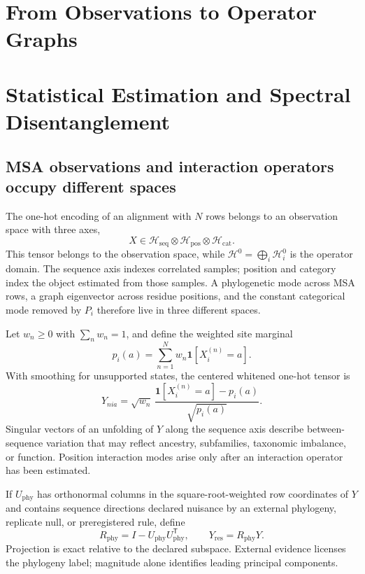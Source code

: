 \documentclass[10pt]{article}
\theoremstyle{definition}
\theoremstyle{remark}
\newcommand{\BookChapter}[1]{\section{#1}}
\newcommand{\BookInsert}[1]{}
\newcommand{\BookChapterLabel}[1]{}
\newcommand{\BookSection}[1]{\subsection{#1}}
\begin{document}
\ifdefined\BOOKMODE
\BookChapter{From Observations to Operator Graphs}
\BookChapterLabel{chap:book-observations}
\else
\BookChapter{Statistical Estimation and Spectral Disentanglement}
\fi
\BookInsert{chapters/08_opening}

\BookSection{MSA observations and interaction operators occupy different spaces}

The one-hot encoding of an alignment with $N$ rows belongs to an observation space with three axes,
\begin{equation}
X\in
\mathcal H_{\mathrm{seq}}
\otimes\mathcal H_{\mathrm{pos}}
\otimes\mathcal H_{\mathrm{cat}}.
\label{eq:msa-three-axes}
\end{equation}
This tensor belongs to the observation space, while
$\mathcal H^0=\bigoplus_i\mathcal H_i^0$ is the operator domain.  The sequence axis indexes
correlated samples; position and category index the object estimated from those samples.  A
phylogenetic mode across MSA rows, a graph eigenvector across residue positions, and the constant
categorical mode removed by $P_i$ therefore live in three different spaces.

Let $w_n\geq0$ with $\sum_nw_n=1$, and define the weighted site marginal
\begin{equation}
p_i(a)=\sum_{n=1}^Nw_n\mathbf1[X_i^{(n)}=a].
\label{eq:weighted-msa-marginal}
\end{equation}
With smoothing for unsupported states, the centered whitened one-hot tensor is
\begin{equation}
Y_{nia}
=\sqrt{w_n}\,
\frac{\mathbf1[X_i^{(n)}=a]-p_i(a)}{\sqrt{p_i(a)}}.
\label{eq:whitened-msa}
\end{equation}
Singular vectors of an unfolding of $Y$ along the sequence axis describe between-sequence
variation that may reflect ancestry, subfamilies, taxonomic imbalance, or function.  Position
interaction modes arise only after an interaction operator has been estimated.

If $U_{\mathrm{phy}}$ has orthonormal columns in the square-root-weighted row coordinates of $Y$
and contains sequence directions declared nuisance by an external phylogeny, replicate null, or
preregistered rule, define
\begin{equation}
R_{\mathrm{phy}}=I-U_{\mathrm{phy}}U_{\mathrm{phy}}^{\mathsf T},
\qquad
Y_{\mathrm{res}}=R_{\mathrm{phy}}Y.
\label{eq:phylogeny-projection}
\end{equation}
Projection is exact relative to the declared subspace.  External evidence licenses the phylogeny
label; magnitude alone identifies leading principal components.
\end{document}
